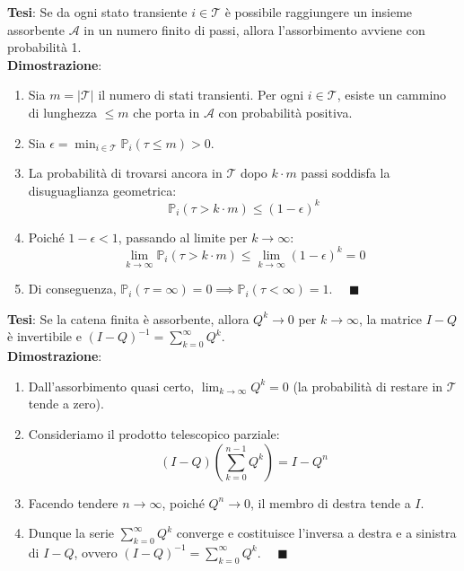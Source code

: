 \documentclass[11pt, a4paper]{report}
\theoremstyle{plain}
\theoremstyle{definition}
\theoremstyle{remark}
\newcommand{\PP}{\mathbb{P}}
\newcommand{\1}{\mathbf{1}}
\begin{document}
\begin{lavagna}[{1. Dimostrazione: Assorbimento Quasi Certo $\PP(\tau < \infty) = 1$ in Catene Finite}]
\textbf{Tesi}: Se da ogni stato transiente $i \in \mathcal{T}$ è possibile raggiungere un insieme assorbente $\mathcal{A}$ in un numero finito di passi, allora l'assorbimento avviene con probabilità 1.\\
\textbf{Dimostrazione}:
\begin{enumerate}
    \item Sia $m = |\mathcal{T}|$ il numero di stati transienti. Per ogni $i \in \mathcal{T}$, esiste un cammino di lunghezza $\le m$ che porta in $\mathcal{A}$ con probabilità positiva.
    \item Sia $\epsilon = \min_{i \in \mathcal{T}} \PP_i(\tau \le m) > 0$.
    \item La probabilità di trovarsi ancora in $\mathcal{T}$ dopo $k \cdot m$ passi soddisfa la disuguaglianza geometrica:
    \[ \PP_i(\tau > k \cdot m) \le (1 - \epsilon)^k \]
    \item Poiché $1 - \epsilon < 1$, passando al limite per $k \to \infty$:
    \[ \lim_{k \to \infty} \PP_i(\tau > k \cdot m) \le \lim_{k \to \infty} (1-\epsilon)^k = 0 \]
    \item Di conseguenza, $\PP_i(\tau = \infty) = 0 \implies \PP_i(\tau < \infty) = 1$. $\quad \blacksquare$
\end{enumerate}
\end{lavagna}

\begin{lavagna}
\textbf{Tesi}: Se la catena finita è assorbente, allora $Q^k \to 0$ per $k \to \infty$, la matrice $I-Q$ è invertibile e $(I-Q)^{-1} = \sum_{k=0}^\infty Q^k$.\\
\textbf{Dimostrazione}:
\begin{enumerate}
    \item Dall'assorbimento quasi certo, $\lim_{k \to \infty} Q^k = 0$ (la probabilità di restare in $\mathcal{T}$ tende a zero).
    \item Consideriamo il prodotto telescopico parziale:
    \[ (I - Q) \left( \sum_{k=0}^{n-1} Q^k \right) = I - Q^n \]
    \item Facendo tendere $n \to \infty$, poiché $Q^n \to 0$, il membro di destra tende a $I$.
    \item Dunque la serie $\sum_{k=0}^\infty Q^k$ converge e costituisce l'inversa a destra e a sinistra di $I-Q$, ovvero $(I-Q)^{-1} = \sum_{k=0}^\infty Q^k$. $\quad \blacksquare$
\end{enumerate}
\end{lavagna}
\end{document}
